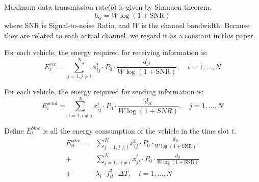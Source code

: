 \documentclass[conference]{IEEEtran}
\begin{document}
Maximum data transmission rate($b$) is given by Shannon theorem. 
\begin{equation}
	b_{ij} = W\log (1 + \text{SNR})
\end{equation}
where SNR is Signal-to-noise Ratio, and $W$ is the channel bandwidth. Because they are related to each actual channel, we regard it as a constant in this paper. 

For each vehicle, the energy required for receiving information is:
\begin{equation}
	E_{i}^{r e c}=\sum_{j =1, j \ne i}^{N} x _{ij}^{t} \cdot P_0 \cdot \frac{d_{jt}}{W\log (1 + \text{SNR})}, 
	\quad  i = 1, \dots ,N
\end{equation}

For each vehicle, the energy required for sending information is:
\begin{equation}
	E_{i}^{send}=\sum_{i =1, i \ne j}^{N} x _{ij}^{t} \cdot P_0 \cdot \frac{d_{it}}{W\log (1 + SNR)},
	\quad  j = 1, \dots ,N
\end{equation}    

Define $E^{blnc}_ {t} $ is all the energy consumption of the vehicle in the time slot $t$. 
\begin{equation}
	\begin{aligned}
		E^{blnc} _{it}=
		&\sum_{j=1, j \ne i}^{N} x _{ij}^{t} \cdot P_0 \cdot \frac{d_{jt}}{W\log (1 + \text{SNR})}   \\
		+ &\sum_{j=1, , j \ne i}^{N} x _{ji}^{t} \cdot P_0 \cdot \frac{d_{it}}{W\log (1 + \text{SNR})}   \\
		+ &  \lambda_{i} \cdot f_{it}^{3} \cdot \Delta T
		, \quad i = 1, \dots ,N	
	\end{aligned}
\end{equation}
\end{document}
